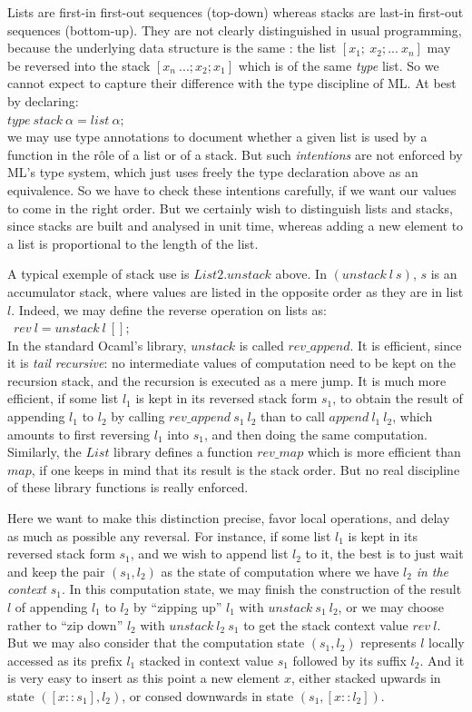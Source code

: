 \documentclass[12pt]{article}
\begin{document}
Lists are first-in first-out sequences (top-down) whereas stacks
are last-in first-out sequences (bottom-up). They are not clearly
distinguished in usual programming, because the underlying data structure
is the same : the list $[x_1;~x_2; ...~x_n]$ may be reversed into
the stack $[x_n~...; x_2; x_1]$ which is of the same {\sl type} list. So
we cannot expect to capture their difference with the type discipline of ML.
At best by declaring:\\
$type~stack~\alpha = list~\alpha;$\\
we may use type annotations to document whether a given list is used by
a function in the r\^ole of a list or of a stack. But such {\sl intentions}
are not enforced by ML's type system, which just uses freely the type
declaration above as an equivalence. So we have to check
these intentions carefully, if we want our values to come in the right
order. But we certainly wish to distinguish lists and stacks, since stacks
are built and analysed in unit time, whereas adding a new element to a list
is proportional to the length of the list. 

A typical exemple of stack use is $List2.unstack$ above. 
In $(unstack~l~s)$, $s$ is an accumulator stack, where values are listed
in the opposite order as they are in list $l$. Indeed, we may define
the reverse operation on lists as:\\
~$rev~l = unstack~l~[];$\\

In the standard Ocaml's library, $unstack$ is called $rev\_append$.
It is efficient, since it is {\sl tail recursive}: no intermediate values 
of computation need to be kept on the recursion stack, and the recursion
is executed as a mere jump. It is much more efficient, if some list $l_1$
is kept in its reversed stack form $s_1$, to obtain the result of 
appending $l_1$ to $l_2$ by calling $rev\_append~s_1~l_2$ 
than to call $append~l_1~l_2$,
which amounts to first reversing $l_1$ into $s_1$, 
and then doing the same computation.
Similarly, the $List$ library defines a function $rev\_map$ which is
more efficient than $map$, if one keeps in mind that its result 
is the stack order.
But no real discipline of these library functions is really enforced.

Here we want to make this distinction precise, favor local operations, and
delay as much as possible any reversal. For instance, if some list $l_1$
is kept in its reversed stack form $s_1$, and we wish to append list 
$l_2$ to it,
the best is to just wait and keep the pair $(s_1,l_2)$ as the state
of computation where we have $l_2$ {\sl in the context} $s_1$. 
In this computation
state, we may finish the construction of the result $l$ of appending 
$l_1$ to $l_2$ by ``zipping up'' $l_1$ with $unstack~s_1~l_2$, 
or we may choose rather to ``zip down'' $l_2$ with $unstack~l_2~s_1$ 
to get the stack context value $rev~l$. But we may also consider that
the computation state $(s_1,l_2)$ represents $l$ locally accessed
as its prefix $l_1$ stacked in context value $s_1$ followed
by its suffix $l_2$. And it is very easy to insert as this point a new
element $x$, either stacked upwards in state $([x::s_1],l_2)$, 
or consed downwards in state $(s_1,[x::l_2])$. 
\end{document}

